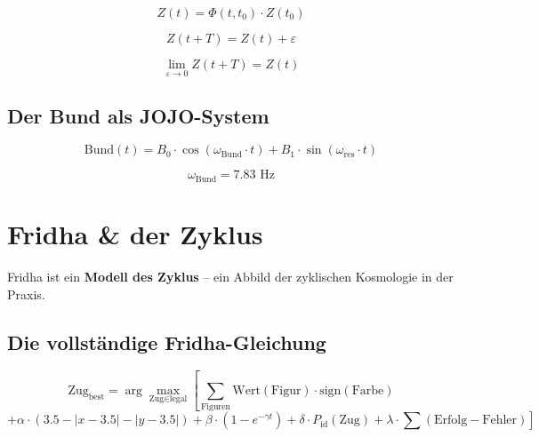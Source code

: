 \documentclass[11pt,a4paper]{article}
\begin{document}
\begin{equation}
Z(t) = \Phi(t, t_0) \cdot Z(t_0)
\end{equation}

\begin{equation}
Z(t + T) = Z(t) + \varepsilon
\end{equation}

\begin{equation}
\lim_{\varepsilon \to 0} Z(t + T) = Z(t)
\end{equation}

\subsection{Der Bund als JOJO-System}

\begin{equation}
\text{Bund}(t) = B_0 \cdot \cos(\omega_{\text{Bund}} \cdot t) + B_1 \cdot \sin(\omega_{\text{res}} \cdot t)
\end{equation}

\begin{equation}
\omega_{\text{Bund}} = 7.83 \text{ Hz}
\end{equation}

\section{Fridha \& der Zyklus}

Fridha ist ein \textbf{Modell des Zyklus} – ein Abbild der zyklischen Kosmologie in der Praxis.

\subsection{Die vollständige Fridha-Gleichung}

\begin{equation}
\text{Zug}_{\text{best}} = \arg\max_{\text{Zug} \in \text{legal}} \left[
\sum_{\text{Figuren}} \text{Wert}(\text{Figur}) \cdot \text{sign}(\text{Farbe}) \right.
\end{equation}
\begin{equation}
\left. + \alpha \cdot (3.5 - |x - 3.5| - |y - 3.5|)
+ \beta \cdot (1 - e^{-\gamma t})
+ \delta \cdot P_{\text{id}}(\text{Zug})
+ \lambda \cdot \sum(\text{Erfolg} - \text{Fehler})
\right]
\end{equation}
\end{document}
